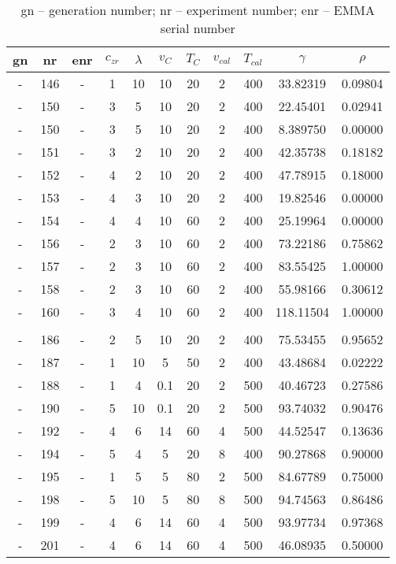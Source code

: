\begin{table}[ht]
	\centering
	\label{tab:pre-emma}
	\begin{tabular}{ccc|cccccc|cc}
        \hline\hline
		gn  &nr	    &enr	&$c_{zr}$	    &$\lambda$	&$v_{C}$	&$T_{C}$	&$v_{cal}$	&$T_{cal}$	&$\gamma$	&$\rho$\\
        \hline
-	&146	&-		&1	&10	&10	&20	&2	&400 &33.82319	&0.09804\\
-	&150	&-		&3	&5	&10	&20	&2	&400 &22.45401	&0.02941\\
-	&150	&-		&3	&5	&10	&20	&2	&400 &8.389750	&0.00000\\
-	&151	&-		&3	&2	&10	&20	&2	&400 &42.35738	&0.18182\\
-	&152	&-		&4	&2	&10	&20	&2	&400 &47.78915	&0.18000\\
-	&153	&-		&4	&3	&10	&20	&2	&400 &19.82546	&0.00000\\
-	&154	&-		&4	&4	&10	&60	&2	&400 &25.19964	&0.00000\\
-	&156	&-		&2	&3	&10	&60	&2	&400 &73.22186	&0.75862\\
-	&157	&-		&2	&3	&10	&60	&2	&400 &83.55425	&1.00000\\
-	&158	&-		&2	&3	&10	&60	&2	&400 &55.98166	&0.30612\\
-	&160	&-		&3	&4	&10	&60	&2	&400 &118.11504	&1.00000\\
   			   	                            &&&&&&&&&&\\
-	&186	&-		&2	&5	&10	&20	&2	&400 &75.53455	&0.95652\\
-	&187	&-		&1	&10	&5	&50	&2	&400 &43.48684	&0.02222\\
-	&188	&-		&1	&4	&0.1	&20	&2	&500 &40.46723	&0.27586\\
-	&190	&-		&5	&10	&0.1	&20	&2	&500 &93.74032	&0.90476\\
-	&192	&-		&4	&6	&14	&60	&4	&500 &44.52547	&0.13636\\
-	&194	&-		&5	&4	&5	&20	&8	&400 &90.27868	&0.90000\\
-	&195	&-		&1	&5	&5	&80	&2	&500 &84.67789	&0.75000\\
-	&198	&-		&5	&10	&5	&80	&8	&500 &94.74563	&0.86486\\
-	&199	&-		&4	&6	&14	&60	&4	&500 &93.97734	&0.97368\\
-	&201	&-		&4	&6	&14	&60	&4	&500 &46.08935	&0.50000\\
    \hline\hline
	\end{tabular}
    \caption{
        gn -- generation number; 
        nr -- experiment number; 
        enr -- EMMA serial number} 
\end{table}


